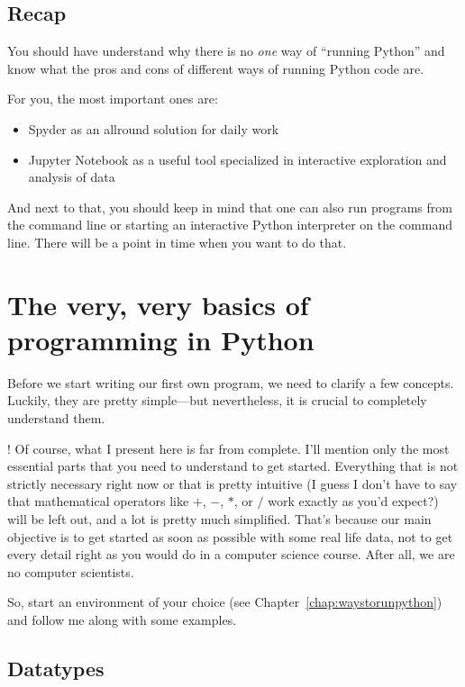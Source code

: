 \documentclass[a4paper,12pt]{book}
\let\oldquote\quote
\let\endoldquote\endquote
\renewenvironment{quote}{
\oldquote\footnotesize
\lettrine[lines=3]{\color{BrickRed}!}{ }}
{\endoldquote}
\begin{document}
\section{Recap}
You should have understand why there is no \emph{one} way of ``running Python'' and know what the pros and cons of different ways of running Python code are. 

For you, the most important ones are:

\begin{itemize}
	\item Spyder as an allround solution for daily work
	\item Jupyter Notebook as a useful tool specialized in interactive exploration and analysis of data
\end{itemize}
 
And next to that, you should keep in mind that one can also run programs from the command line or starting an interactive Python interpreter on the command line. There will be a point in time when you want to do that.

 
 
 
\chapter{The very, very basics of programming in Python}
\label{chap:basics}
Before we start writing our first own program, we need to clarify a few concepts. Luckily, they are pretty simple---but nevertheless, it is crucial to completely understand them. 

\begin{quote}
Of course, what I present here is far from complete. I'll mention only the most essential parts that you need to understand to get started. Everything that is not strictly necessary right now or that is pretty intuitive (I guess I don't have to say that mathematical operators like $+$, $-$, $*$, or $/$ work exactly as you'd expect?) will be left out, and a lot is pretty much simplified. That's because our main objective is to get started as soon as possible with some real life data, not to get every detail right as you would do in a computer science course. After all, we are no computer scientists.  
\end{quote}

So, start an environment of your choice (see Chapter~\ref{chap:waystorunpython}) and follow me along with some examples.


\section{Datatypes}
\label{datatypes}
\end{document}

